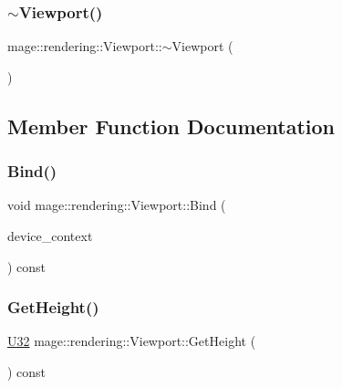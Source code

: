 \subsubsection{\texorpdfstring{$\sim$\+Viewport()}{~Viewport()}}
{\footnotesize\ttfamily mage\+::rendering\+::\+Viewport\+::$\sim$\+Viewport (\begin{DoxyParamCaption}{ }\end{DoxyParamCaption})\hspace{0.3cm}{\ttfamily [default]}}



\subsection{Member Function Documentation}
\hypertarget{classmage_1_1rendering_1_1_viewport_a8aeb392ce46ab413d607cdea36033e21}{}\label{classmage_1_1rendering_1_1_viewport_a8aeb392ce46ab413d607cdea36033e21} 
\subsubsection{\texorpdfstring{Bind()}{Bind()}}
{\footnotesize\ttfamily void mage\+::rendering\+::\+Viewport\+::\+Bind (\begin{DoxyParamCaption}\item[{I\+D3\+D11\+Device\+Context \&}]{device\+\_\+context }\end{DoxyParamCaption}) const\hspace{0.3cm}{\ttfamily [noexcept]}}

\hypertarget{classmage_1_1rendering_1_1_viewport_a89247ccb96e4e018d66ad6b5416cd039}{}\label{classmage_1_1rendering_1_1_viewport_a89247ccb96e4e018d66ad6b5416cd039} 
\subsubsection{\texorpdfstring{Get\+Height()}{GetHeight()}}
{\footnotesize\ttfamily \hyperlink{namespacemage_a41c104c036fba3756a74e19f793eeaa1}{U32} mage\+::rendering\+::\+Viewport\+::\+Get\+Height (\begin{DoxyParamCaption}{ }\end{DoxyParamCaption}) const\hspace{0.3cm}{\ttfamily [noexcept]}}

